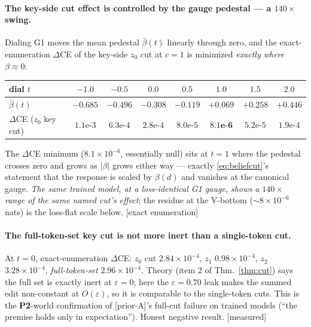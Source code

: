 \documentclass{article}
\newcommand{\bped}{\beta}
\newcommand{\htag}[1]{{\normalfont\sffamily\footnotesize[#1]}}
\newcommand{\Ptwo}{\textbf{P2}}
\newcommand{\priorA}{\textsf{[prior-A]}}
\begin{document}
\paragraph{The key-side cut effect is controlled by the gauge pedestal --- a
$140\times$ swing.} Dialing G1 moves the mean pedestal $\bar\bped(t)$ linearly
through zero, and the exact-enumeration $\Delta$CE of the key-side $z_0$ cut at
$c=1$ is minimized \emph{exactly where $\bped\approx0$}:
\begin{center}
\begin{tabular}{lccccccc}
\toprule
dial $t$ & $-1.0$ & $-0.5$ & $0.0$ & $0.5$ & $\mathbf{1.0}$ & $1.5$ & $2.0$\\
\midrule
$\bar\bped(t)$ & $-0.685$ & $-0.496$ & $-0.308$ & $-0.119$ & $\mathbf{+0.069}$ & $+0.258$ & $+0.446$\\
$\Delta$CE ($z_0$ key cut) & $1.1\text{e-}3$ & $6.3\text{e-}4$ & $2.8\text{e-}4$ & $8.0\text{e-}5$ & $\mathbf{8.1\text{e-}6}$ & $5.2\text{e-}5$ & $1.9\text{e-}4$\\
\bottomrule
\end{tabular}
\end{center}
The $\Delta$CE minimum ($8.1\times10^{-6}$, essentially null) sits at $t=1$ where the
pedestal crosses zero and grows as $|\bped|$ grows either way --- exactly
\eqref{eq:beliefcut}'s statement that the response is scaled by $\bped(d)$ and
vanishes at the canonical gauge. \emph{The same trained model, at a loss-identical
G1 gauge, shows a $140\times$ range of the same named cut's effect}; the residue at
the V-bottom ($\sim\!8\times10^{-6}$ nats) is the loss-flat scale below. \htag{exact
enumeration}

\paragraph{The full-token-set key cut is not more inert than a single-token cut.}
At $t=0$, exact-enumeration $\Delta$CE: $z_0$ cut $2.84\times10^{-4}$, $z_1$
$0.98\times10^{-4}$, $z_2$ $3.28\times10^{-4}$, \emph{full-token-set}
$2.96\times10^{-4}$. Theory (item 2 of Thm.~\ref{thm:cut}) says the full set is
exactly inert at $\varepsilon=0$; here the $\varepsilon=0.70$ leak makes the summed
edit non-constant at $O(\varepsilon)$, so it is comparable to the single-token cuts.
This is the \Ptwo-world confirmation of \priorA's full-cut failure on trained models
(``the premise holds only in expectation''). Honest negative result.
\htag{measured}
\end{document}
